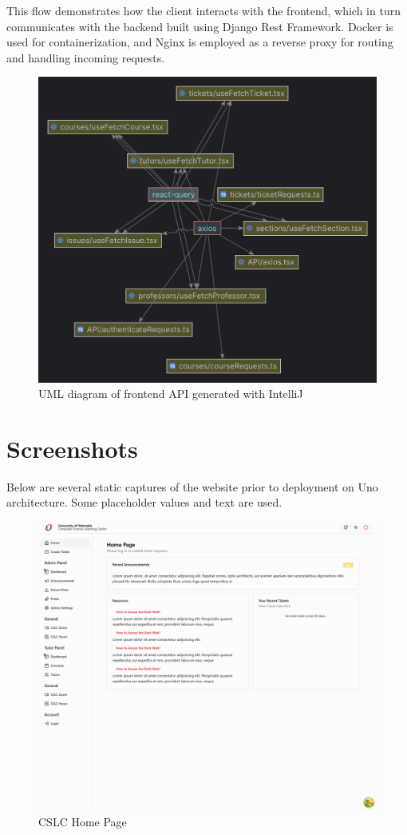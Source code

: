 \documentclass[oneside,openany,obeyspaces]{book}
\newcommand\tab[1][1cm]{\hspace*{#1}}
\begin{document}
\begin{flushleft}
    This flow demonstrates how the client interacts with the frontend, which in turn communicates with the backend built using Django Rest Framework. Docker is used for containerization, and Nginx is employed as a reverse proxy for routing and handling incoming requests.
    \begin{figure}
        \centering
        \includegraphics[width=160mm,scale=0.5]{img/API-uml.png}
        \caption{UML diagram of frontend API generated with IntelliJ}
        \label{fig:UML of frontend API}
    \end{figure}



    \section{Screenshots}

    \tab Below are several static captures of the website prior to deployment on Uno architecture. Some placeholder values and text are used.

    \begin{figure}
        \centering
        \includegraphics[width=0.75\linewidth]{img/Home Page.png}
        \caption{CSLC Home Page}
        \label{fig:Home Page}
    \end{figure}


\end{flushleft}
\end{document}
